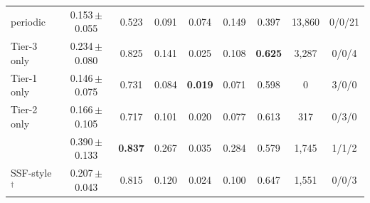 \begin{tabular}{@{}lcccccccc@{}}
periodic & 0.153{\,\scriptsize$\pm$0.055} & 0.523 & 0.091 & 0.074 & 0.149 & 0.397 & 13,860 & 0/0/21 \\
Tier-3 only & 0.234{\,\scriptsize$\pm$0.080} & 0.825 & 0.141 & 0.025 & 0.108 & \textbf{0.625} & 3,287 & 0/0/4 \\
Tier-1 only & 0.146{\,\scriptsize$\pm$0.075} & 0.731 & 0.084 & \textbf{0.019} & 0.071 & 0.598 & 0 & 3/0/0 \\
Tier-2 only & 0.166{\,\scriptsize$\pm$0.105} & 0.717 & 0.101 & 0.020 & 0.077 & 0.613 & 317 & 0/3/0 \\
\drift{} & 0.390{\,\scriptsize$\pm$0.133} & \textbf{0.837} & 0.267 & 0.035 & 0.284 & 0.579 & 1,745 & 1/1/2 \\
SSF-style$^\dagger$ & 0.207{\,\scriptsize$\pm$0.043} & 0.815 & 0.120 & 0.024 & 0.100 & 0.647 & 1,551 & 0/0/3 \\
\bottomrule
\end{tabular}